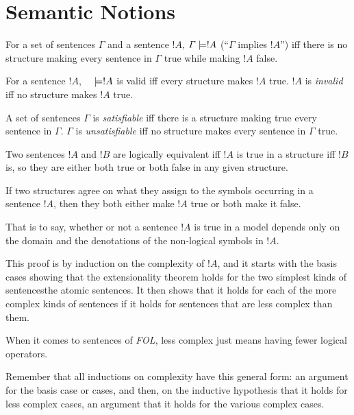 \documentclass[syntax-and-semantics]{subfiles}
\begin{document}
\section{Semantic Notions}


\begin{defn}[Consequence]
For a set of sentences $\Gamma$ and a sentence $!A$, $\Gamma \models !A$ (``$\Gamma$ implies $!A$'') iff there is no structure making every sentence in $\Gamma$ true while making $!A$ false.
\end{defn}

\begin{defn}[Validity]
For a sentence $!A$, $\hspace{1em}\models !A$ is valid iff every structure makes $!A$ true. $!A$ is \emph{invalid} iff no structure makes $!A$ true.
\end{defn}

\begin{defn}[Satisfiability]
A set of sentences $\Gamma$ is \emph{satisfiable} iff there is a structure making true every sentence in $\Gamma$. $\Gamma$ is \emph{unsatisfiable} iff no structure makes every sentence in $\Gamma$ true.
\end{defn}

\begin{defn}
Two sentences $!A$ and $!B$ are logically equivalent iff $!A$ is true in a structure iff $!B$ is, so they are either both true or both false in any given structure.
\end{defn}


\begin{thm}[Extensionality]
If two structures agree on what they assign to the symbols occurring in a sentence $!A$, then they both either make $!A$ true or both make it false.
\end{thm}

\begin{wordy}
That is to say, whether or not a sentence $!A$ is true in a model depends only on the domain and the denotations of the non-logical symbols in $!A$.

This proof is by induction on the complexity of $!A$, and it starts with the basis cases showing that the extensionality theorem holds for the two simplest kinds of sentences\textemdash the atomic sentences. It then shows that it holds for each of the more complex kinds of sentences if it holds for sentences that are less complex than them.

When it comes to sentences of \emph{FOL}, less complex just means having fewer logical operators.

Remember that all inductions on complexity have this general form: an argument for the basis case or cases, and then, on the inductive hypothesis that it holds for less complex cases, an argument that it holds for the various complex cases.
\end{wordy}
\end{document}
